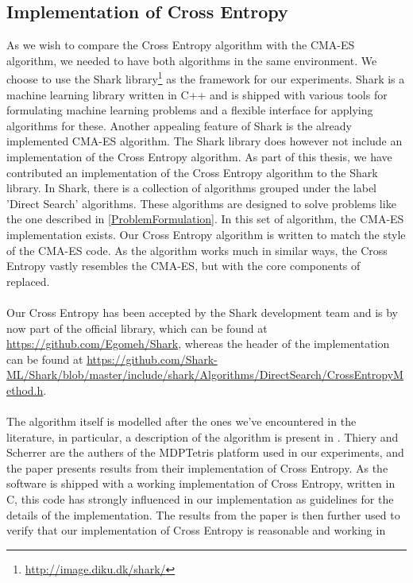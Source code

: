 \subsection{Implementation of Cross Entropy}

As we wish to compare the Cross Entropy algorithm 
with the CMA-ES algorithm, we needed to have both algorithms
in the same environment. We choose to use the Shark 
library\footnote{\url{http://image.diku.dk/shark/}}
as the framework for our experiments. Shark is a machine 
learning library written in C++ and is shipped with various tools
for formulating machine learning problems and a flexible 
interface for applying algorithms for these. Another appealing
feature of Shark is the already implemented CMA-ES algorithm.
The Shark library does however not include an implementation of
the Cross Entropy algorithm. As part of this thesis, we have contributed
an implementation of the Cross Entropy algorithm to the Shark library.
In Shark, there is a collection of algorithms grouped under the label
'Direct Search' algorithms. These algorithms are designed to solve 
problems like the one described in \ref{ProblemFormulation}. In this
set of algorithm, the CMA-ES implementation exists. Our Cross Entropy
algorithm is written to match the style of the CMA-ES code. As the algorithm
works much in similar ways, the Cross Entropy vastly resembles the CMA-ES, 
but with the core components of replaced.\\
\\
Our Cross Entropy has been accepted by the Shark development team and is 
by now part of the official library, which can be found at 
\url{https://github.com/Egomeh/Shark}, whereas the header of the 
implementation can be found at 
\url{https://github.com/Shark-ML/Shark/blob/master/include/shark/Algorithms/DirectSearch/CrossEntropyMethod.h}.\\
\\
The algorithm itself is modelled after the ones we've encountered 
in the literature, in particular, a description of the algorithm is 
present in \citep{thiery:09}. Thiery and Scherrer are the authers of the 
MDPTetris platform used in our experiments, and the paper presents 
results from their implementation of Cross Entropy. As the 
software is shipped with a working implementation of Cross Entropy, written in C,
this code has strongly influenced in our implementation as guidelines for
the details of the implementation. The results from the paper is then further used
to verify that our implementation of Cross Entropy is reasonable and working in 
